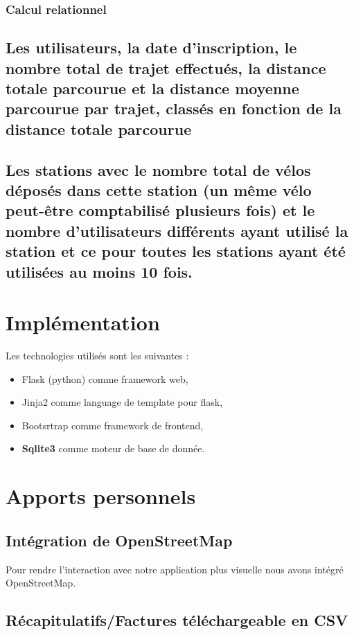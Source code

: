 \documentclass[a4paper,10pt]{article}
\begin{document}
\subsubsection{Calcul relationnel}

\subsection{Les utilisateurs, la date d'inscription, le nombre total de trajet effectués, la distance totale parcourue et la distance moyenne parcourue par trajet, classés en fonction de la distance totale parcourue}


\subsection{Les stations avec le nombre total de vélos déposés dans cette station (un même vélo peut-être comptabilisé plusieurs fois) et le nombre d'utilisateurs différents ayant utilisé la station et ce pour toutes les stations ayant été utilisées au moins 10 fois.}


\section{Implémentation}
Les technologies utilisés sont les suivantes :
\begin{itemize}
	\item Flask (python) comme framework web,
	\item Jinja2 comme language de template pour flask,
	\item Bootsrtrap comme framework de frontend,
	\item \textbf{Sqlite3} comme moteur de base de donnée.
\end{itemize}

\section{Apports personnels}

\subsection{Intégration de OpenStreetMap}
Pour rendre l'interaction avec notre application plus visuelle nous avons intégré OpenStreetMap.

\subsection{Récapitulatifs/Factures téléchargeable en CSV} %
\end{document}
